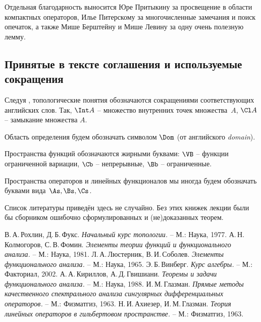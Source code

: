 \documentclass[a4paper]{article}
\begin{document}
Отдельная благодарность выносится Юре Притыкину за просвещение в области компактных операторов,
Илье Питерскому за многочисленные замечания и поиск опечаток, а также Мише Берштейну и Мише Левину
за одну очень полезную лемму.

\subsection*{Принятые в тексте соглашения и используемые сокращения}

\begin{points}{-3}
\item Следуя \cite{rokhlin}, топологические понятия обозначаются сокращениями соответствующих
      английских слов. Так, $\Int A$ -- множество внутренних точек множества~$A$, $\Cl A$ --
      замыкание множества $A$.
\item Область определения будем обозначать символом $\Dom$ (от английского \emph{domain}).

\item Пространства функций обозначаются жирными буквами: $\VB$ -- функции ограниченной вариации,
      $\Cb$ -- непрерывные, $\Bb$ -- ограниченные.
\item Пространства операторов и линейных функционалов мы иногда будем обозначать буквами
      вида~$\As, \Bs, \Cs$.
\end{points}

Список литературы приведён здесь не случайно. Без этих книжек лекции были бы сборником ошибочно
сформулированных и (не)доказанных теорем.

\begin{thebibliography}{4}
\setlength\itemsep{-.5mm}
    В.\,А.\,Рохлин, Д.\,Б.\,Фукс. \emph{Начальный курс топологии.} -- М.: Наука, 1977.
    А.\,Н.\,Колмогоров, С.\,В.\,Фомин. \emph{Элементы теории функций и функционального анализа.} -- М.: Наука, 1981.
    Л.\,А.\,Люстерник, В.\,И.\,Соболев. \emph{Элементы функционального анализа.} -- М.: Наука, 1965.
    Э.\,Б.\,Винберг. \emph{Курс алгебры.} -- М.: Факториал, 2002.
    А.\,А.\,Кириллов, А.\,Д.\,Гвишиани. \emph{Теоремы и задачи функционального анализа.} -- М.: Наука, 1988.
    И.\,М.\,Глазман. \emph{Прямые методы качественного спектрального анализа сингулярных
    дифференциальных операторов.} -- М.: Физматгиз, 1963.
    Н.\,И.\,Ахиезер, И.\,М.\,Глазман. \emph{Теория линейных операторов в гильбертовом пространстве.} -- М.: Физматгиз, 1963.
\end{thebibliography}
\end{document}

